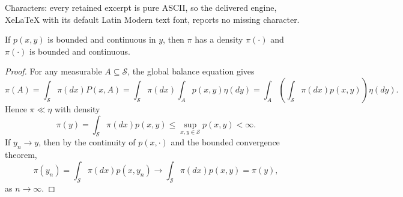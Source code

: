 \documentclass[10pt,a4paper]{amsart}
\newcommand\prs[1]{\left(#1\right)}
\newcommand{\Scal}{\mathcal{S}}
\newcommand{\gti}{\rightarrow\infty}
\begin{document}
Characters: every retained excerpt is pure ASCII, so the delivered engine, XeLaTeX with its default Latin Modern text font, reports no missing character.
\begin{proposition}
\label{density_proposition}
If $p(x,y)$ is bounded and continuous in $y$, then $\pi$ has a density $\pi(\cdot)$ and $\pi(\cdot)$ is bounded and continuous.
\end{proposition}

\begin{proof}
    For any measurable $A\subseteq\Scal$, the global balance equation gives
    \[
    \pi(A)=\int_\Scal\pi(dx)P(x,A)=\int_\Scal\pi(dx)\int_A p(x,y)\eta(dy)=\int_A\prs{\int_\Scal\pi(dx)p(x,y)}\eta(dy).
    \]
    Hence $\pi\ll\eta$ with density
    \[
    \pi(y)=\int_\Scal\pi(dx)p(x,y)\leq\sup_{x,y\in\Scal}p(x,y)<\infty.
    \]
    If $y_n\rightarrow y$, then by the continuity of $p(x,\cdot)$ and the bounded convergence theorem,
    \[
    \pi(y_n)=\int_\Scal\pi(dx)p(x,y_n)\rightarrow\int_\Scal\pi(dx)p(x,y)=\pi(y),
    \]
    as $n\gti.$
\end{proof}
\end{document}
